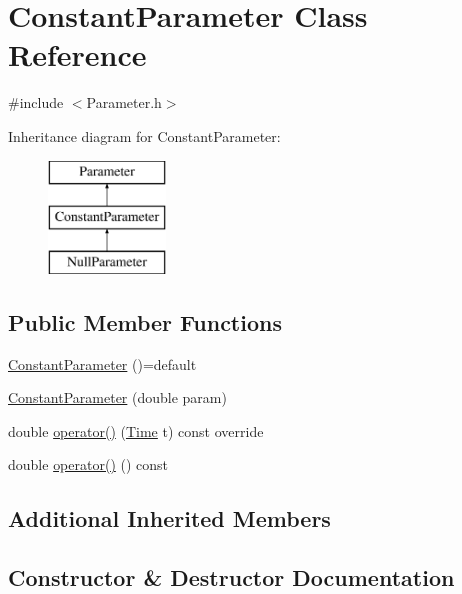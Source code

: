 \hypertarget{class_constant_parameter}{}\section{Constant\+Parameter Class Reference}
\label{class_constant_parameter}


{\ttfamily \#include $<$Parameter.\+h$>$}

Inheritance diagram for Constant\+Parameter\+:\begin{figure}[H]
\begin{center}
\leavevmode
\includegraphics[height=3.000000cm]{class_constant_parameter}
\end{center}
\end{figure}
\subsection*{Public Member Functions}
\begin{DoxyCompactItemize}
\item 
\hyperlink{class_constant_parameter_a914cfa1103bc8361f8f668316af04f27}{Constant\+Parameter} ()=default
\item 
\hyperlink{class_constant_parameter_ae3bc9ec65c93b6b88fe04dcb7010d897}{Constant\+Parameter} (double param)
\item 
double \hyperlink{class_constant_parameter_a23abb141692843e2ef68d43f610beb5e}{operator()} (\hyperlink{_name_def_8h_ac2d3e0ba793497bcca555c7c2cf64ff3}{Time} t) const override
\item 
double \hyperlink{class_constant_parameter_a8ce664e975d03c38141462813b360913}{operator()} () const
\end{DoxyCompactItemize}
\subsection*{Additional Inherited Members}


\subsection{Constructor \& Destructor Documentation}
\hypertarget{class_constant_parameter_a914cfa1103bc8361f8f668316af04f27}{}\label{class_constant_parameter_a914cfa1103bc8361f8f668316af04f27} 
